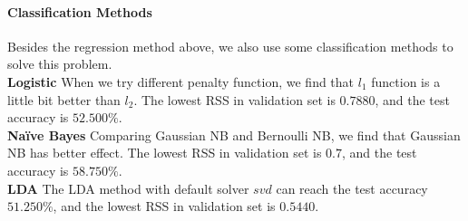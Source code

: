 \documentclass{article}
\begin{document}
\begin{figure}[htbp]
\centering
{}%
%
%
\centering
\end{figure}


\paragraph{Classification Methods}
Besides the regression method above, we also use some classification methods to solve this problem.\\
\textbf{Logistic} When we try different penalty function, we find that $l_1$ function is a little bit better than $l_2$. The lowest RSS in validation set is $0.7880$, and the test accuracy is $52.500\%$.\\
\textbf{Naïve Bayes} Comparing Gaussian NB and Bernoulli NB, we find that Gaussian NB has better effect. The lowest RSS in validation set is $0.7$, and the test accuracy is $58.750\%$.\\
\textbf{LDA} The LDA method with default solver $svd$ can reach the test accuracy $51.250\%$, and the lowest RSS in validation set is $0.5440$.
\end{document}
